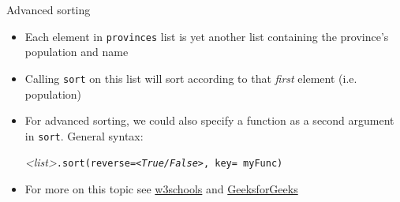 \documentclass[xcolor=svgnames]{beamer}
\begin{document}
\begin{frame}{Advanced sorting}
\begin{itemize}
\item Each element in {\tt provinces} list is yet another list containing the province's population and name
\vfill
\item  Calling {\tt sort} on this list will sort according to that \textit{first} element (i.e. population)
\vfill
\item For advanced sorting, we could also specify a function as a second argument in {\tt sort}.  General syntax:
\begin{center}
\textit{<list>}{\tt .sort(reverse=\textit{<True/False>}, key= myFunc)}
\end{center}
\vfill
\item For more on this topic see \href{https://www.w3schools.com/python/ref\_list\_sort.asp}{w3schools} and \href{https://www.geeksforgeeks.org/python-list-sort/}{GeeksforGeeks}
\end{itemize}

\end{frame}
\end{document}
